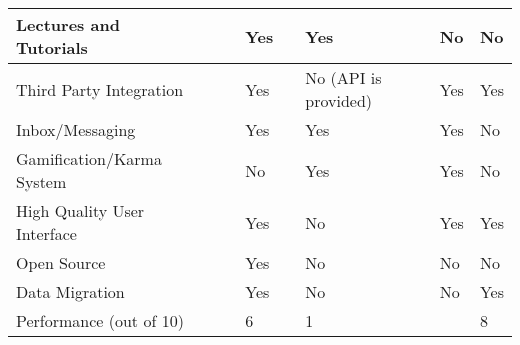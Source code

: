 \begin{table}[ht]
{\begin{tabular}{llllllll}
        \multicolumn{1}{|l|}{Lectures and Tutorials}      & \multicolumn{1}{l|}{} & \multicolumn{1}{l|}{} & \multicolumn{1}{l|}{Yes} & \multicolumn{1}{l|}{} & \multicolumn{1}{l|}{Yes}                       & \multicolumn{1}{l|}{No} & \multicolumn{1}{l|}{No} \\ \hline
        \multicolumn{1}{|l|}{Third Party Integration}     & \multicolumn{1}{l|}{} & \multicolumn{1}{l|}{} & \multicolumn{1}{l|}{Yes} & \multicolumn{1}{l|}{} & \multicolumn{1}{l|}{No (API is provided)}      & \multicolumn{1}{l|}{Yes} & \multicolumn{1}{l|}{Yes} \\ \hline
        \multicolumn{1}{|l|}{Inbox/Messaging}             & \multicolumn{1}{l|}{} & \multicolumn{1}{l|}{} & \multicolumn{1}{l|}{Yes} & \multicolumn{1}{l|}{} & \multicolumn{1}{l|}{Yes}                       & \multicolumn{1}{l|}{Yes} & \multicolumn{1}{l|}{No} \\ \hline
        \multicolumn{1}{|l|}{Gamification/Karma System}   & \multicolumn{1}{l|}{} & \multicolumn{1}{l|}{} & \multicolumn{1}{l|}{No} & \multicolumn{1}{l|}{} & \multicolumn{1}{l|}{Yes}                       & \multicolumn{1}{l|}{Yes} & \multicolumn{1}{l|}{No} \\ \hline
        \multicolumn{1}{|l|}{High Quality User Interface} & \multicolumn{1}{l|}{} & \multicolumn{1}{l|}{} & \multicolumn{1}{l|}{Yes} & \multicolumn{1}{l|}{} & \multicolumn{1}{l|}{No}                        & \multicolumn{1}{l|}{Yes} & \multicolumn{1}{l|}{Yes} \\ \hline
        \multicolumn{1}{|l|}{Open Source}                 & \multicolumn{1}{l|}{} & \multicolumn{1}{l|}{} & \multicolumn{1}{l|}{Yes} & \multicolumn{1}{l|}{} & \multicolumn{1}{l|}{No}                        & \multicolumn{1}{l|}{No} & \multicolumn{1}{l|}{No} \\ \hline
        \multicolumn{1}{|l|}{Data Migration}              & \multicolumn{1}{l|}{} & \multicolumn{1}{l|}{} & \multicolumn{1}{l|}{Yes} & \multicolumn{1}{l|}{} & \multicolumn{1}{l|}{No}                        & \multicolumn{1}{l|}{No} & \multicolumn{1}{l|}{Yes} \\ \hline
        Performance (out of 10)                           &                       &                       & 6                      &                       & 1                                              &                       & 8                      \\ \hline
    \end{tabular}}
\end{table}






